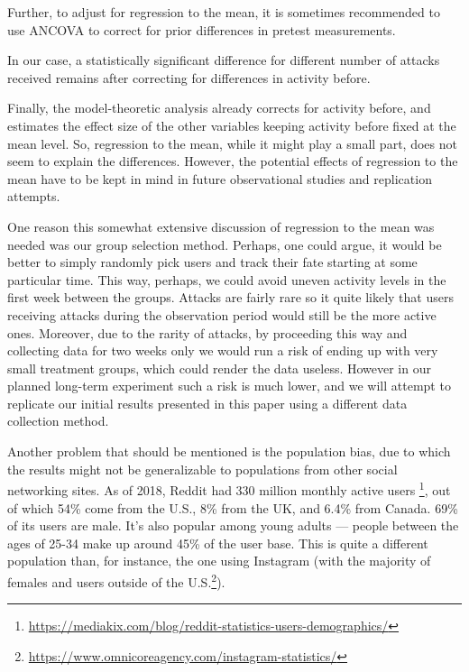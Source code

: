 \documentclass[
  10pt,
  dvipsnames]{scrartcl}
\begin{document}
\begin{table}[H]
\footnotesize
{}
\normalsize 
\caption{Results of ANCOVA test of activity difference vs. activity before and the number of narrow attacks received.}
\end{table}

Further, to adjust for regression to the mean, it is sometimes
recommended to use ANCOVA to correct for prior differences in pretest
measurements.

\noindent In our case, a statistically significant difference for
different number of attacks received remains after correcting for
differences in activity before.

Finally, the model-theoretic analysis already corrects for activity
before, and estimates the effect size of the other variables keeping
activity before fixed at the mean level. So, regression to the mean,
while it might play a small part, does not seem to explain the
differences. However, the potential effects of regression to the mean
have to be kept in mind in future observational studies and replication
attempts.

One reason this somewhat extensive discussion of regression to the mean
was needed was our group selection method. Perhaps, one could argue, it
would be better to simply randomly pick users and track their fate
starting at some particular time. This way, perhaps, we could avoid
uneven activity levels in the first week between the groups. Attacks are
fairly rare so it quite likely that users receiving attacks during the
observation period would still be the more active ones. Moreover, due to
the rarity of attacks, by proceeding this way and collecting data for
two weeks only we would run a risk of ending up with very small
treatment groups, which could render the data useless. However in our
planned long-term experiment such a risk is much lower, and we will
attempt to replicate our initial results presented in this paper using a
different data collection method.

Another problem that should be mentioned is the population bias, due to
which the results might not be generalizable to populations from other
social networking sites. As of 2018, Reddit had 330 million monthly
active users
\footnote{\url{https://mediakix.com/blog/reddit-statistics-users-demographics/}},
out of which 54\% come from the U.S., 8\% from the UK, and 6.4\% from
Canada. 69\% of its users are male. It's also popular among young adults
--- people between the ages of 25-34 make up around 45\% of the user
base. This is quite a different population than, for instance, the one
using Instagram (with the majority of females and users outside of the
U.S.\footnote{\url{https://www.omnicoreagency.com/instagram-statistics/}}).
\end{document}
